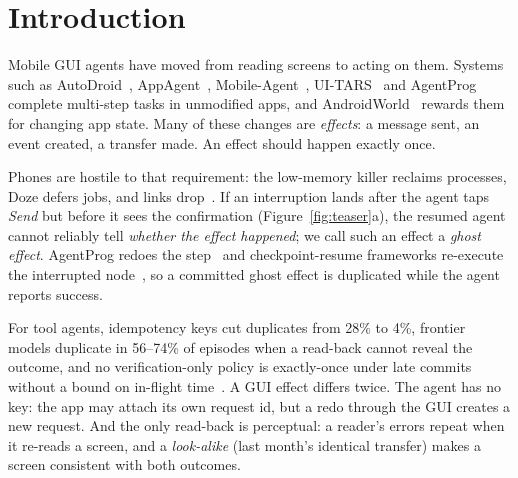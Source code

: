 \section{Introduction}
\label{sec:intro}



Mobile GUI agents have moved from reading screens to acting on them. Systems such as
AutoDroid~\cite{wen2024autodroid}, AppAgent~\cite{zhang2025appagent}, Mobile-Agent~\cite{wang2024mobileagent,ye2025mobileagentv3},
UI-TARS~\cite{qin2025uitars} and AgentProg~\cite{tian2025agentprog} complete multi-step tasks in unmodified apps, and
AndroidWorld~\cite{rawles2025androidworld} rewards them for changing app state. Many of these changes are \emph{effects}: a message sent,
an event created, a transfer made. An effect should happen exactly once.

Phones are hostile to that requirement: the low-memory killer reclaims processes, Doze defers jobs, and links drop~\cite{android_lmkd,android_doze,sentosa2025cellreplay}.
If an interruption lands after the agent taps \emph{Send} but before it sees the confirmation (Figure~\ref{fig:teaser}a), the resumed agent cannot reliably tell \emph{whether
the effect happened}; we call such an effect a \emph{ghost effect}. AgentProg redoes the step~\cite{tian2025agentprog} and checkpoint-resume frameworks re-execute the
interrupted node~\cite{khan2026resume,langgraph_durable}, so a committed ghost effect is duplicated while the agent reports success.

For tool agents, idempotency keys cut duplicates from 28\% to 4\%, frontier models duplicate in 56--74\% of episodes when a read-back cannot reveal the outcome, and no
verification-only policy is exactly-once under late commits without a bound on in-flight time~\cite{li2026exactlyonce,sah2026undobench,liu2026retrybench}. A GUI effect
differs twice. The agent has no key: the app may attach its own request id, but a redo through the GUI creates a new request. And the only read-back is perceptual: a reader's
errors repeat when it re-reads a screen, and a \emph{look-alike} (last month's identical transfer) makes a screen consistent with both outcomes.

